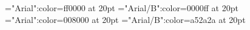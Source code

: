 \documentclass[a4paper]{article}
\begin{document}
 
\pagestyle{plain} 
\font\ta="Arial":color=ff0000 at 20pt
\font\tbta="Arial/B":color=0000ff at 20pt
\font\tctbta="Arial":color=008000 at 20pt
\font\tdtbta="Arial/B":color=a52a2a at 20pt

\pagestyle{fancy} 






\end{document}
